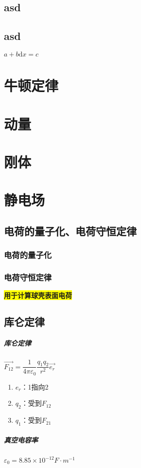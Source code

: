 \documentclass[UTF8,a4paper,12pt,scheme=chinese]{ctexbook}
\newcommand{\sll}[1]{\overrightarrow{#1}}
\newcommand{\ud}{\mathrm{d}}
\newcommand{\hl}[1]{\colorbox{yellow}{#1}}
\begin{document}
	\section{asd}
	\section{asd}
	$ a+b \ud x = c $
	\chapter{牛顿定律}
	\chapter{动量}
	\chapter{刚体}
	\chapter{静电场}
	\section{电荷的量子化、电荷守恒定律}
	\subsection{电荷的量子化}
	\subsection{电荷守恒定律}
	\hl{\textbf{用于计算球壳表面电荷}}
	\section{库仑定律}
	
	
	\paragraph{库仑定律} $ \sll{F_{12}} = \dfrac{1}{4\pi\varepsilon_0}\dfrac{q_1q_2}{r^2}\sll{e_r} $
	\begin{enumerate}
		\item $e_r$：1指向2
		\item $q_2$：受到$ F_{12} $
		\item $q_1$：受到$ F_{21} $
	\end{enumerate}
	\paragraph{真空电容率}$ \varepsilon_0=8.85\times10^{-12}F\cdot m^{-1} $
\end{document}
